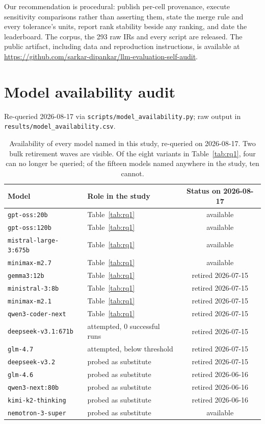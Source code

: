 \documentclass{article}
\begin{document}
Our recommendation is procedural: publish per-cell provenance, execute sensitivity comparisons rather than asserting them, state the merge rule and every tolerance's units, report rank stability beside any ranking, and date the leaderboard. The corpus, the 293 raw IRs and every script are released. The public artifact, including data and reproduction instructions, is available at \url{https://github.com/sarkar-dipankar/llm-evaluation-self-audit}.

\appendix

\section{Model availability audit}
\label{app:availability}
Re-queried 2026-08-17 via \texttt{scripts/model\_availability.py}; raw output in \texttt{results/model\_availability.csv}.

\begin{table}[!h]
\caption{Availability of every model named in this study, re-queried on 2026-08-17. Two bulk retirement waves are visible. Of the eight variants in Table~\ref{tab:rq1}, four can no longer be queried; of the fifteen models named anywhere in the study, ten cannot.}
\label{tab:availability}
\centering
\small
\begin{tabular}{llc}
\toprule
Model & Role in the study & Status on 2026-08-17 \\
\midrule
\texttt{gpt-oss:20b}          & Table~\ref{tab:rq1} & available \\
\texttt{gpt-oss:120b}         & Table~\ref{tab:rq1} & available \\
\texttt{mistral-large-3:675b} & Table~\ref{tab:rq1} & available \\
\texttt{minimax-m2.7}         & Table~\ref{tab:rq1} & available \\
\texttt{gemma3:12b}           & Table~\ref{tab:rq1} & retired 2026-07-15 \\
\texttt{ministral-3:8b}       & Table~\ref{tab:rq1} & retired 2026-07-15 \\
\texttt{minimax-m2.1}         & Table~\ref{tab:rq1} & retired 2026-07-15 \\
\texttt{qwen3-coder-next}     & Table~\ref{tab:rq1} & retired 2026-07-15 \\
\midrule
\texttt{deepseek-v3.1:671b}   & attempted, 0 successful runs & retired 2026-07-15 \\
\texttt{glm-4.7}              & attempted, below threshold   & retired 2026-07-15 \\
\texttt{deepseek-v3.2}        & probed as substitute & retired 2026-07-15 \\
\texttt{glm-4.6}              & probed as substitute & retired 2026-06-16 \\
\texttt{qwen3-next:80b}       & probed as substitute & retired 2026-06-16 \\
\texttt{kimi-k2-thinking}     & probed as substitute & retired 2026-06-16 \\
\texttt{nemotron-3-super}     & probed as substitute & available \\
\bottomrule
\end{tabular}
\end{table}
\end{document}
